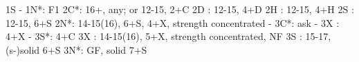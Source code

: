 1S - 1N*: F1
2C*: 16+, any; or 12-15, 2+C
2D : 12-15, 4+D
2H : 12-15, 4+H
2S : 12-15, 6+S
2N*: 14-15(16), 6+S, 4+X, strength concentrated
   - 3C*: ask
        - 3X : 4+X
        - 3S*: 4+C
3X : 14-15(16), 5+X, strength concentrated, NF
3S : 15-17, (s-)solid 6+S
3N*: GF, solid 7+S